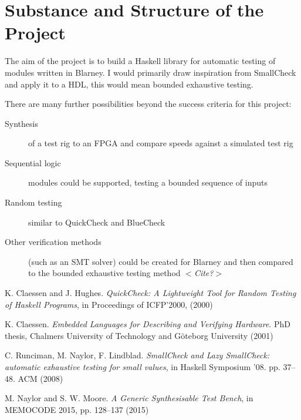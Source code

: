 \documentclass[UKenglish, 12pt]{article}
\newcommand{\al}{$<$}
\newcommand{\ar}{$>$}
\begin{document}
\section*{Substance and Structure of the Project}

The aim of the project is to build a Haskell library for automatic testing
of modules written in Blarney. I would primarily draw inspiration from
SmallCheck~\cite{SmallCheck} and apply it to a HDL, this would mean
bounded exhaustive testing.

There are many further possibilities beyond the success criteria for this
project:
\begin{description}

\item [Synthesis] of a test rig to an FPGA and compare speeds against a simulated test rig~\cite{BlueCheck}

\item [Sequential logic] modules could be supported, testing a bounded sequence of inputs~\cite{BlueCheck}

\item [Random testing] similar to QuickCheck and BlueCheck~\cite{QuickCheck}\cite{BlueCheck}

\item [Other verification methods] (such as an SMT solver) could be created for Blarney and then compared to the bounded exhaustive testing method \al\emph{Cite?}\ar

\end{description}

\begin{thebibliography}{9}

    K. Claessen and J. Hughes. \emph{QuickCheck:  A Lightweight Tool for Random Testing of Haskell Programs}, in Proceedings of ICFP’2000, (2000)

    K. Claessen. \emph{Embedded Languages for Describing and Verifying Hardware}.  PhD thesis, Chalmers University of Technology and G\"oteborg University (2001)
    
    C. Runciman, M. Naylor, F. Lindblad. \emph{SmallCheck and Lazy SmallCheck: automatic exhaustive testing for small values}, in Haskell Symposium ’08. pp. 37–48. ACM (2008) 
    
    M. Naylor and S. W. Moore. \emph{A Generic Synthesisable Test Bench}, in MEMOCODE 2015, pp. 128–137 (2015)
    
\end{thebibliography}
\end{document}
